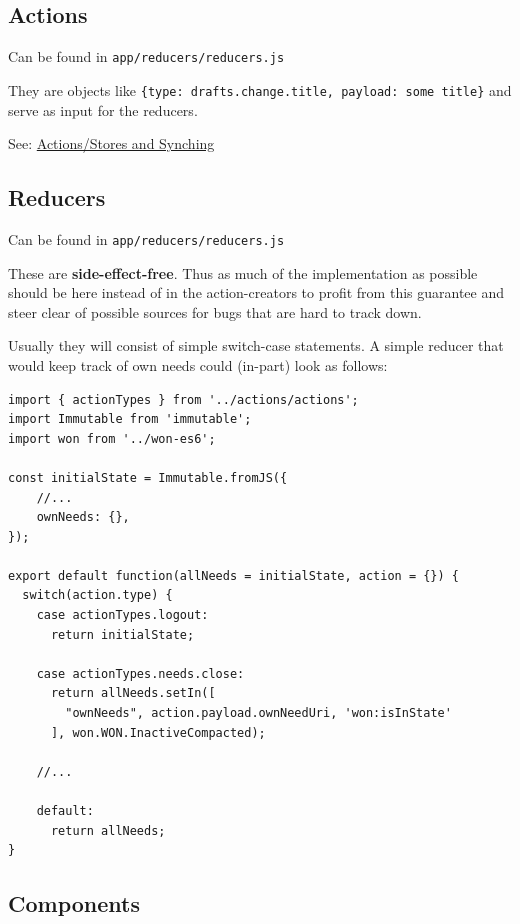 \subsection{Actions}\label{actions}

Can be found in \texttt{app/reducers/reducers.js} %

They are objects like
\texttt{\{type:\ \textquotesingle{}drafts.change.title\textquotesingle{},\ payload:\ \textquotesingle{}some\ title\textquotesingle{}\}}
and serve as input for the reducers.

See:
\href{https://github.com/researchstudio-sat/webofneeds/issues/342}{Actions/Stores
and Synching} %

\subsection{Reducers}\label{reducers}

Can be found in \texttt{app/reducers/reducers.js} %

These are \textbf{side-effect-free}. Thus as much of the implementation
as possible should be here instead of in the action-creators
to profit from this guarantee and steer clear of possible sources for
bugs that are hard to track down.

Usually they will consist of simple switch-case statements. A simple
reducer that would keep track of own needs could (in-part) look as 
follows:

\begin{verbatim}
import { actionTypes } from '../actions/actions';
import Immutable from 'immutable';
import won from '../won-es6';

const initialState = Immutable.fromJS({
    //...
    ownNeeds: {},
});

export default function(allNeeds = initialState, action = {}) {
  switch(action.type) {
    case actionTypes.logout:
      return initialState;

    case actionTypes.needs.close:
      return allNeeds.setIn([
        "ownNeeds", action.payload.ownNeedUri, 'won:isInState'
      ], won.WON.InactiveCompacted);

    //...

    default:
      return allNeeds;
}
\end{verbatim}


\subsection{Components}\label{components}

